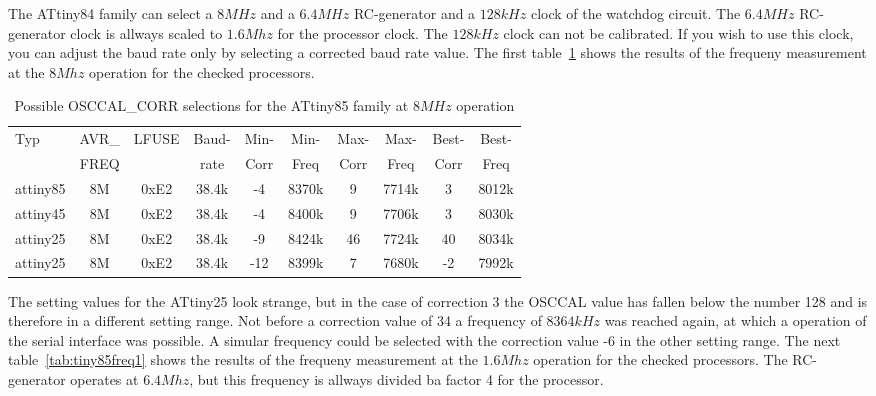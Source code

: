 The ATtiny84 family can select a \(8MHz\) and a \(6.4MHz\) RC-generator and
a \(128kHz\) clock of the watchdog circuit.
The \(6.4MHz\) RC-generator clock is allways scaled to \(1.6Mhz\) for
the processor clock.
The \(128kHz\) clock can not be calibrated. If you wish to use this clock,
you can adjust the baud rate only by selecting a corrected baud rate value.
The first table~\ref{tab:tiny85freq8} shows the results of the frequeny measurement
at the \(8Mhz\) operation for the checked processors.

\begin{table}[H]
  \begin{center}
    \begin{tabular}{| l | c | c | c || c | c || c | c || c | c |}
    \hline
   Typ  &       AVR\_ & LFUSE & Baud- & Min- & Min- & Max- & Max- & Best- & Best-  \\
        &       FREQ  &       & rate & Corr & Freq & Corr & Freq  & Corr  & Freq  \\
    \hline
    \hline
attiny85 &          8M & 0xE2  & 38.4k &  -4  & 8370k &  9  & 7714k  & 3  & 8012k \\
    \hline
attiny45  &         8M & 0xE2  & 38.4k &  -4  & 8400k & 9  & 7706k  & 3  & 8030k \\
    \hline
attiny25  &         8M & 0xE2  & 38.4k &  -9  & 8424k & 46  & 7724k  & 40  & 8034k \\
attiny25  &         8M & 0xE2  & 38.4k &  -12  & 8399k & 7  & 7680k  & -2  & 7992k \\
    \hline
    \end{tabular}
  \end{center}
  \caption{Possible OSCCAL\_CORR selections for the ATtiny85 family at \(8MHz\) operation}
  \label{tab:tiny85freq8}
\end{table}

The setting values for the ATtiny25 look strange, but in the case of correction 3
the OSCCAL value has fallen below the number 128 and is therefore in a different
setting range.
Not before a correction value of 34 a frequency of \(8364kHz\) was reached again,
at which a operation of the serial interface was possible.
A simular frequency could be selected with the correction value -6 in the other
setting range.
The next table~\ref{tab:tiny85freq1} shows the results of the frequeny measurement
at the \(1.6Mhz\) operation for the checked processors.
The RC-generator operates at \(6.4Mhz\), but this frequency is allways divided
ba factor 4 for the processor.

